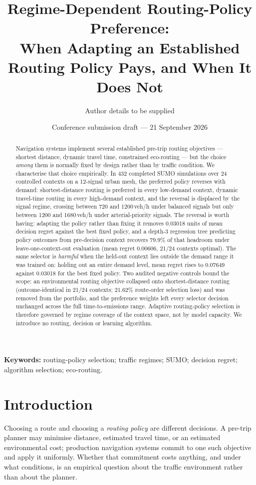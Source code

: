 \documentclass[10pt,a4paper]{article}
\title{Regime-Dependent Routing-Policy Preference:\\When Adapting an Established Routing Policy Pays, and When It Does Not}
\author{Author details to be supplied}
\date{Conference submission draft --- 21 September 2026}
\begin{document}
\maketitle

\begin{abstract}
Navigation systems implement several established pre-trip routing objectives --- shortest distance, dynamic travel time, constrained eco-routing --- but the choice \emph{among} them is normally fixed by design rather than by traffic condition. We characterise that choice empirically. In 432 completed SUMO simulations over 24 controlled contexts on a 12-signal urban mesh, the preferred policy reverses with demand: shortest-distance routing is preferred in every low-demand context, dynamic travel-time routing in every high-demand context, and the reversal is displaced by the signal regime, crossing between 720 and 1200\,veh/h under balanced signals but only between 1200 and 1680\,veh/h under arterial-priority signals. The reversal is worth having: adapting the policy rather than fixing it removes 0.03018 units of mean decision regret against the best fixed policy, and a depth-3 regression tree predicting policy outcomes from pre-decision context recovers 79.9\% of that headroom under leave-one-context-out evaluation (mean regret 0.00606, 21/24 contexts optimal). The same selector is \emph{harmful} when the held-out context lies outside the demand range it was trained on: holding out an entire demand level, mean regret rises to 0.07649 against 0.03018 for the best fixed policy. Two audited negative controls bound the scope: an environmental routing objective collapsed onto shortest-distance routing (outcome-identical in 21/24 contexts; 21.62\% route-order selection loss) and was removed from the portfolio, and the preference weights left every selector decision unchanged across the full time-to-emissions range. Adaptive routing-policy selection is therefore governed by regime coverage of the context space, not by model capacity. We introduce no routing, decision or learning algorithm.
\end{abstract}
\textbf{Keywords:} routing-policy selection; traffic regimes; SUMO; decision regret; algorithm selection; eco-routing.

\section{Introduction}
Choosing a route and choosing a \emph{routing policy} are different decisions. A pre-trip planner may minimise distance, estimated travel time, or an estimated environmental cost; production navigation systems commit to one such objective and apply it uniformly. Whether that commitment costs anything, and under what conditions, is an empirical question about the traffic environment rather than about the planner.
\end{document}
